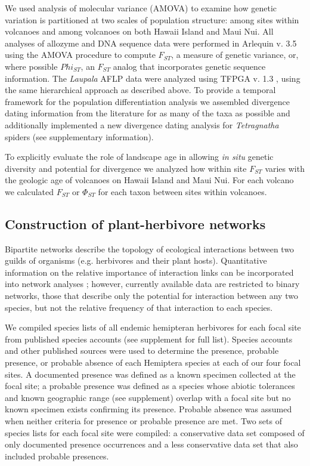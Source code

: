 \documentclass[12pt]{article}
\begin{document}
\begin{linenumbers}
We used analysis of molecular variance (AMOVA) to examine how genetic
variation is partitioned at two scales of population structure: among
sites within volcanoes and among volcanoes on both Hawaii Island and
Maui Nui. All analyses of allozyme and DNA sequence data were
performed in Arlequin v. 3.5 \citep{arlequin} using the AMOVA
procedure to compute $F_{ST}$, a measure of genetic variance, or,
where possible $Phi_{ST}$, an $F_{ST}$ analog that incorporates
genetic sequence information. The {\it Laupala} AFLP data were analyzed
using TFPGA v. 1.3 \citep{miller1997}, using the same hierarchical
approach as described above. To provide a temporal framework for the
population differentiation analysis we assembled divergence dating
information from the literature for as many of the taxa as possible
and additionally implemented a new divergence dating analysis for
{\it Tetragnatha} spiders (see supplementary information).

To explicitly evaluate the role of landscape age in allowing {\it in
  situ} genetic diversity and potential for divergence we analyzed how
within site $F_{ST}$ varies with the geologic age of volcanoes on
Hawaii Island and Maui Nui. For each volcano we calculated $F_{ST}$ or
$\Phi_{ST}$ \citep{arlequin} for each taxon between sites within
volcanoes.

\subsection*{Construction of plant-herbivore networks}

Bipartite networks describe the topology of ecological interactions
between two guilds of organisms (e.g. herbivores and their plant
hosts). Quantitative information on the relative importance of
interaction links can be incorporated into network analyses
\citep{Vazquez2009}; however, currently available data are restricted
to binary networks, those that describe only the potential for
interaction between any two species, but not the relative frequency of
that interaction to each species.

We compiled species lists of all endemic hemipteran herbivores for
each focal site from published species accounts (see supplement for
full list). Species accounts and other published sources were used to
determine the presence, probable presence, or probable absence of each
Hemiptera species at each of our four focal sites. A documented
presence was defined as a known specimen collected at the focal site;
a probable presence was defined as a species whose abiotic tolerances
and known geographic range (see supplement) overlap with a focal site
but no known specimen exists confirming its presence. Probable absence
was assumed when neither criteria for presence or probable presence
are met. Two sets of species lists for each focal site were compiled:
a conservative data set composed of only documented presence
occurrences and a less conservative data set that also included
probable presences.


\end{linenumbers}
\end{document}
